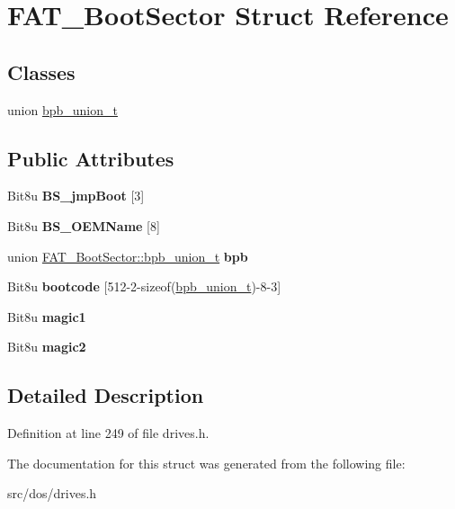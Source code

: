 \hypertarget{structFAT__BootSector}{\section{F\-A\-T\-\_\-\-Boot\-Sector Struct Reference}
\label{structFAT__BootSector}
}
\subsection*{Classes}
\begin{DoxyCompactItemize}
\item 
union \hyperlink{unionFAT__BootSector_1_1bpb__union__t}{bpb\-\_\-union\-\_\-t}
\end{DoxyCompactItemize}
\subsection*{Public Attributes}
\begin{DoxyCompactItemize}
\item 
\hypertarget{structFAT__BootSector_a8cec12b4327031e4ee253071ec29058e}{Bit8u {\bfseries B\-S\-\_\-jmp\-Boot} \mbox{[}3\mbox{]}}\label{structFAT__BootSector_a8cec12b4327031e4ee253071ec29058e}

\item 
\hypertarget{structFAT__BootSector_aef9bcf60ed7d7fbe9243ae61a68c9e91}{Bit8u {\bfseries B\-S\-\_\-\-O\-E\-M\-Name} \mbox{[}8\mbox{]}}\label{structFAT__BootSector_aef9bcf60ed7d7fbe9243ae61a68c9e91}

\item 
\hypertarget{structFAT__BootSector_a4a1d46a437aeb89f86f2f43b65236e3b}{union \hyperlink{unionFAT__BootSector_1_1bpb__union__t}{F\-A\-T\-\_\-\-Boot\-Sector\-::bpb\-\_\-union\-\_\-t} {\bfseries bpb}}\label{structFAT__BootSector_a4a1d46a437aeb89f86f2f43b65236e3b}

\item 
\hypertarget{structFAT__BootSector_a3ff0f82df028239547e8d0aff415bcd2}{Bit8u {\bfseries bootcode} \mbox{[}512-\/2-\/sizeof(\hyperlink{unionFAT__BootSector_1_1bpb__union__t}{bpb\-\_\-union\-\_\-t})-\/8-\/3\mbox{]}}\label{structFAT__BootSector_a3ff0f82df028239547e8d0aff415bcd2}

\item 
\hypertarget{structFAT__BootSector_acbb15432a9ec36696df2afaddbd19b07}{Bit8u {\bfseries magic1}}\label{structFAT__BootSector_acbb15432a9ec36696df2afaddbd19b07}

\item 
\hypertarget{structFAT__BootSector_a4ae2d88769cc3ee146221d057982b74e}{Bit8u {\bfseries magic2}}\label{structFAT__BootSector_a4ae2d88769cc3ee146221d057982b74e}

\end{DoxyCompactItemize}


\subsection{Detailed Description}


Definition at line 249 of file drives.\-h.



The documentation for this struct was generated from the following file\-:\begin{DoxyCompactItemize}
\item 
src/dos/drives.\-h\end{DoxyCompactItemize}
